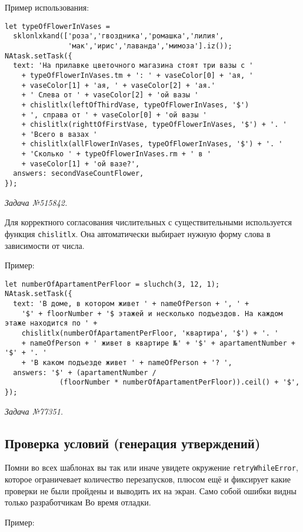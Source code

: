 Пример использования:
\begin{lstlisting}
let typeOfFlowerInVases =
  sklonlxkand(['роза','гвоздника','ромашка','лилия',
               'мак','ирис','лаванда','мимоза'].iz());
NAtask.setTask({
  text: 'На прилавке цветочного магазина стоят три вазы с '
    + typeOfFlowerInVases.tm + ': ' + vaseColor[0] + 'ая, '
    + vaseColor[1] + 'ая, ' + vaseColor[2] + 'ая.' 
    + ' Слева от ' + vaseColor[2] + 'ой вазы '
    + chislitlx(leftOfThirdVase, typeOfFlowerInVases, '$')
    + ', справа от ' + vaseColor[0] + 'ой вазы '
    + chislitlx(righttOfFirstVase, typeOfFlowerInVases, '$') + '. '
    + 'Всего в вазах '
    + chislitlx(allFlowerInVases, typeOfFlowerInVases, '$') + '. '
    + 'Сколько ' + typeOfFlowerInVases.rm + ' в '
    + vaseColor[1] + 'ой вазе?',
  answers: secondVaseCountFlower,
});
\end{lstlisting}
\textsl{Задача №515842.}

Для корректного согласования числительных с существительными используется функция \texttt{chislitlx}. Она автоматически выбирает нужную форму слова в зависимости от числа.  

Пример:
\begin{lstlisting}
let numberOfApartamentPerFloor = sluchch(3, 12, 1);
NAtask.setTask({
  text: 'В доме, в котором живет ' + nameOfPerson + ', ' +
    '$' + floorNumber + '$ этажей и несколько подъездов. На каждом этаже находится по ' +
    chislitlx(numberOfApartamentPerFloor, 'квартира', '$') + '. '
    + nameOfPerson + ' живет в квартире №' + '$' + apartamentNumber + '$' + '. '
    + 'В каком подъезде живет ' + nameOfPerson + '? ',
  answers: '$' + (apartamentNumber /
             (floorNumber * numberOfApartamentPerFloor)).ceil() + '$',
});
\end{lstlisting}
\textsl{Задача №77351.}

\subsection{Проверка условий (генерация утверждений)}

Помни во всех шаблонах вы так или иначе увидете окружение \texttt{retryWhileError}, которое ограничевает количество перезапусков, плюсом ещё и фиксирует какие проверки не были пройдены и выводить их на экран. Само собой ошибки видны только разработчикам Во время отладки.

Пример: 


